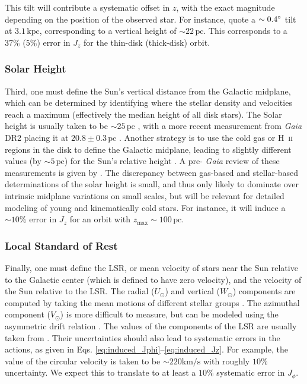 \documentclass[twocolumn]{aastex62}
\newcommand{\pc}{\text{pc}}
\newcommand{\kpc}{\text{kpc}}
\newcommand{\kms}{\text{km}/\text{s}}
\begin{document}
This tilt will contribute a systematic offset in $z$, with the exact magnitude
depending on the position of the observed star. For instance,
\citet{2014ApJ...797...53G} quote a $\sim0.4\degree$ tilt at $3.1\,\kpc$,
corresponding to a vertical height of $\sim22\,\pc$. This corresponds to a
$37\%$ ($5\%$) error in $J_z$ for the thin-disk (thick-disk) orbit.

\subsubsection{Solar Height}
Third, one must define the Sun's vertical distance from the Galactic midplane,
which can be determined by identifying where the stellar density and
velocities reach a maximum (effectively the median height of all disk stars).
The Solar height is usually taken to be $\sim 25\,\pc$
\citep{2001ApJ...553..184C}, with a more recent measurement from \textit{Gaia}
DR2 placing it at $20.8 \pm 0.3\,\pc$ \citep{2019MNRAS.482.1417B}. Another
strategy is to use the cold gas or H~\textsc{ii} regions in the disk to define
the Galactic midplane, leading to slightly different values (by $\sim 5\,\pc$)
for the Sun's relative height \citep[e.g.][]{2019ApJ...871..145A}. A pre-{\em
Gaia} review of these measurements is given by \citet{2016ARAA..54..529B}. The discrepancy between gas-based and stellar-based determinations of the solar height is small, and thus only likely to dominate over intrinsic midplane variations on small scales, but will be relevant for detailed modeling of young and kinematically cold stars. For instance, it will induce a $\sim10\%$ error in $J_z$ for an
orbit with $z_{\text{max}}\sim100\,\pc$.


\subsubsection{Local Standard of Rest}
Finally, one must define the LSR, or mean velocity of stars near the Sun
relative to the Galactic center (which is defined to have zero velocity), and
the velocity of the Sun relative to the LSR. The radial ($U_{\odot}$) and
vertical ($W_{\odot}$) components are computed by taking the mean motions of
different stellar groups \citep[e.g.][]{2012MNRAS.427..274S}. The azimuthal
component ($V_{\odot}$) is more difficult to measure, but can be modeled using
the asymmetric drift relation \citep{2008gady.book.....B}. The values of the
components of the LSR are usually taken from \citet{2010MNRAS.403.1829S}. Their uncertainties should also lead to systematic errors in the actions, as given in Eqs. \ref{eq:induced_Jphi}--\ref{eq:induced_Jz}. For example, the
value of the circular velocity is taken to be $\sim 220\kms$
\citep[e.g.][]{2012ApJ...759..131B} with roughly $10\%$ uncertainty. We expect this to translate to at least a $10\%$ systematic error in $J_{\phi}$.
\end{document}
